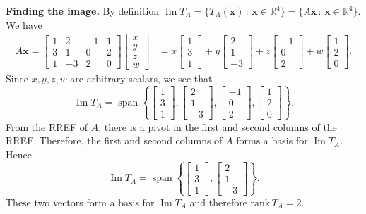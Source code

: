 \documentclass[12pt]{article}
\DeclareMathOperator{\Img}{Im}
\DeclareMathOperator{\Spn}{span}
\begin{document}
\textbf{Finding the image.} By definition $\Img T_A = \{ T_A (\mathbf{x}) \, : \, \mathbf{x} \in \mathbb{R}^4 \} = \{ A \mathbf{x} \, : \, \mathbf{x} \in \mathbb{R}^4 \}$. We have
	\begin{align*}
		A \mathbf{x} = \begin{bmatrix} 1 & 2 & -1 & 1\\3 & 1 & 0 & 2\\1 & -3 & 2 & 0 \end{bmatrix} \begin{bmatrix} x \\ y \\ z \\ w\end{bmatrix} &= x \begin{bmatrix} 1 \\ 3 \\ 1 \end{bmatrix} + y \begin{bmatrix} 2 \\ 1 \\ -3 \end{bmatrix} + z \begin{bmatrix} -1 \\ 0 \\ 2 \end{bmatrix} + w \begin{bmatrix} 1 \\ 2 \\ 0 \end{bmatrix} .
	\end{align*}
Since $x, y, z , w$ are arbitrary scalars, we see that
	\[
		\Img T_A = \Spn \left\{ \begin{bmatrix} 1 \\ 3 \\ 1 \end{bmatrix} , \begin{bmatrix} 2 \\ 1 \\ -3 \end{bmatrix}, \begin{bmatrix} -1 \\ 0 \\ 2 \end{bmatrix}, \begin{bmatrix} 1 \\ 2 \\ 0 \end{bmatrix} \right\} .
	\]
From the RREF of $A$, there is a pivot in the first and second columns of the RREF. Therefore, the first and second columns of $A$ forms a basis for $\Img T_A$. Hence
	\[
		\Img T_A = \Spn \left\{ \begin{bmatrix} 1 \\ 3 \\ 1 \end{bmatrix} , \begin{bmatrix} 2 \\ 1 \\ -3 \end{bmatrix} \right\} .
	\]
These two vectors form a basis for $\Img T_A$ and therefore $\mathrm{rank} \, T_A = 2$. 
\vspace*{10pt}
\end{document}
